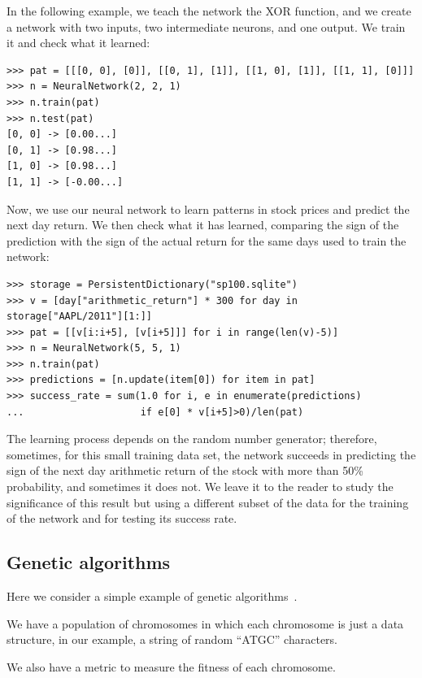 \documentclass[justified, sixbynine]{tufte-book}
\def\ft{\small\tt}
\theoremstyle{plain}%
\newtheorem * {corollary}{Corollary}
\theoremstyle{definition}
\theoremstyle{remark}
\newtheorem * {remark}{Remark}
\newtheorem * {note}{Note}
\begin{document}
\begin{fullwidth}
In the following example, we teach the network the XOR function, and we create a network with two inputs, two intermediate neurons, and one output. We train it and check what it learned:

\begin{lstlisting}[caption={in file: {\ft nlib.py}}]
>>> pat = [[[0, 0], [0]], [[0, 1], [1]], [[1, 0], [1]], [[1, 1], [0]]]
>>> n = NeuralNetwork(2, 2, 1)
>>> n.train(pat)
>>> n.test(pat)
[0, 0] -> [0.00...]
[0, 1] -> [0.98...]
[1, 0] -> [0.98...]
[1, 1] -> [-0.00...]
\end{lstlisting}

Now, we use our neural network to learn patterns in stock prices and predict the next day return. We then check what it has learned, comparing the sign of the prediction with the sign of the actual return for the same days used to train the network:
\begin{lstlisting}[caption={in file: {\ft test.py}}]
>>> storage = PersistentDictionary("sp100.sqlite")
>>> v = [day["arithmetic_return"] * 300 for day in storage["AAPL/2011"][1:]]
>>> pat = [[v[i:i+5], [v[i+5]]] for i in range(len(v)-5)]
>>> n = NeuralNetwork(5, 5, 1)
>>> n.train(pat)
>>> predictions = [n.update(item[0]) for item in pat]
>>> success_rate = sum(1.0 for i, e in enumerate(predictions)
...                    if e[0] * v[i+5]>0)/len(pat)
\end{lstlisting}
The learning process depends on the random number generator; therefore, sometimes, for this small training data set, the network succeeds in predicting the sign of the next day arithmetic return of the stock with more than 50\% probability, and sometimes it does not. We leave it to the reader to study the significance of this result but using a different subset of the data for the training of the network and for testing its success rate.

\goodbreak\subsection{Genetic algorithms}


Here we consider a simple example of genetic algorithms~\cite{barricelli}.

We have a population of chromosomes in which each chromosome is just a data structure, in our example, a string of random ``ATGC'' characters.

We also have a metric to measure the fitness of each chromosome.


\end{fullwidth}
\end{document}
